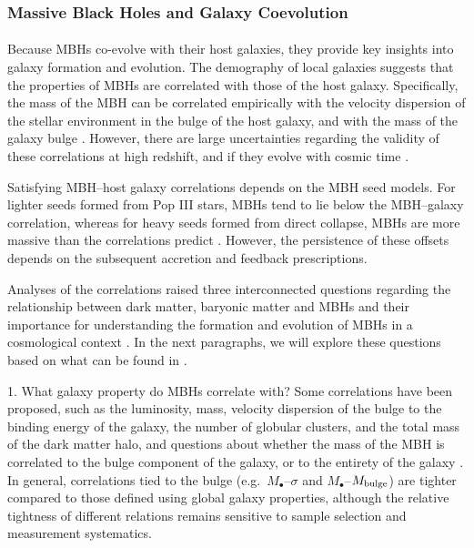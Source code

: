 \documentclass[a4paper,12pt]{article}
\begin{document}
\subsubsection{Massive Black Holes and Galaxy Coevolution}

\paragraph{}
Because MBHs co-evolve with their host galaxies, they provide key insights into galaxy formation and evolution. The demography of local galaxies suggests that the properties of MBHs are correlated with those of the host galaxy\cite{ferrarese2000fundamental}. Specifically, the mass of the MBH can be correlated empirically with the velocity dispersion of the stellar environment in the bulge of the host galaxy, and with the mass of the galaxy bulge \cite{kormendy2013coevolution,matt2023impact}. However, there are large uncertainties regarding the validity of these correlations at high redshift, and if they evolve with cosmic time \cite{volonteri2012formation,kormendy2013coevolution}.

Satisfying MBH--host galaxy correlations depends on the MBH seed models. For lighter seeds formed from Pop III stars, MBHs tend to lie below the MBH--galaxy correlation, whereas for heavy seeds formed from direct collapse, MBHs are more massive than the correlations predict \cite{volonteri2012formation,cammelli2025formation}. However, the persistence of these offsets depends on the subsequent accretion and feedback prescriptions.

Analyses of the correlations raised three interconnected questions regarding the relationship between dark matter, baryonic matter and MBHs and their importance for understanding the formation and evolution of MBHs in a cosmological context \cite{booth2011towards}. In the next paragraphs, we will explore these questions based on what can be found in \cite{volonteri2012formation,reines2015relations,marsden2020case}. 

1. What galaxy property do MBHs correlate with? Some correlations have been proposed, such as the luminosity, mass, velocity dispersion of the bulge to the binding energy of the galaxy, the number of globular clusters, and the total mass of the dark matter halo, and questions about whether the mass of the MBH is correlated to the bulge component of the galaxy, or to the entirety of the galaxy \cite{kormendy2011supermassive,marsden2020case,mountrichas2026black}. In general, correlations tied to the bulge (e.g.\ $M_\bullet$--$\sigma$ and $M_\bullet$--$M_{\rm bulge}$) are tighter compared to those defined using global galaxy properties, although the relative tightness of different relations remains sensitive to sample selection and measurement systematics\cite{marsden2020case}. 
\end{document}
